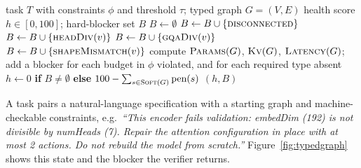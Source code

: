 \documentclass[11pt]{article}
\begin{document}
\begin{algorithm}[t]
\caption{$\textsc{Grade}(T, G)$: the deterministic verifier}
\label{alg:grade}
\begin{algorithmic}[1]
\Require task $T$ with constraints $\phi$ and threshold $\tau$; typed graph $G=(V,E)$
\Ensure health score $h\in[0,100]$; hard-blocker set $B$
\State $B \gets \emptyset$
 $B \gets B \cup \{\textsc{disconnected}\}$ \EndIf
{}
   $B \gets B \cup \{\textsc{headDiv}(v)\}$ \EndIf
   $B \gets B \cup \{\textsc{gqaDiv}(v)\}$ \EndIf
\EndFor
{}
   $B \gets B \cup \{\textsc{shapeMismatch}(v)\}$ \EndIf
\EndFor
\State compute $\textsc{Params}(G)$, $\textsc{Kv}(G)$, $\textsc{Latency}(G)$; add a blocker for each budget in $\phi$ violated, and for each required type absent
\State $h \gets 0$ \textbf{if} $B \neq \emptyset$ \textbf{else} $100 - \sum_{s \in \textsc{Soft}(G)} \text{pen}(s)$
\State \Return $(h, B)$
\end{algorithmic}
\end{algorithm}

A task pairs a natural-language specification with a starting graph and machine-checkable constraints, e.g.\ \emph{``This encoder fails validation: embedDim (192) is not divisible by numHeads (7). Repair the attention configuration in place with at most 2 actions. Do not rebuild the model from scratch.''} Figure~\ref{fig:typedgraph} shows this state and the blocker the verifier returns.
\end{document}
